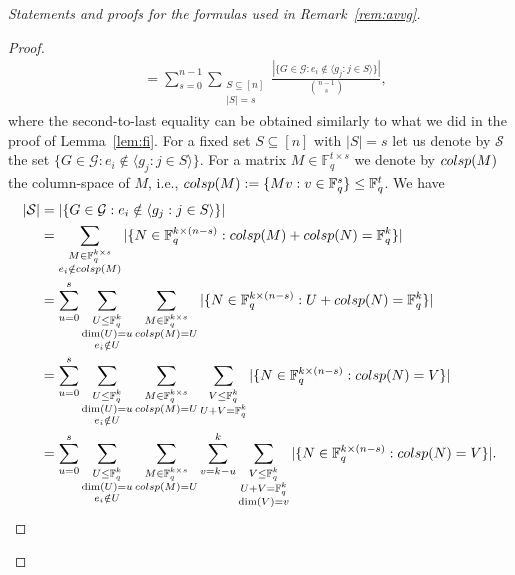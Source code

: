 \documentclass[11pt,a4paper,reqno,twoside]{amsart}
\theoremstyle{definition}
\newcommand{\F}{\mathbb{F}}
\newcommand{\E}{\mathbb{E}}
\newcommand{\mS}{\mathcal{S}}
\newcommand{\mG}{\mathcal{G}}
\begin{document}
\begin{appendix}
\begin{proof}[Statements and proofs for the formulas used in Remark~\ref{rem:avvg}]
\begin{proof}
\begin{align*}
    &= \sum_{s=0}^{n-1}\sum_{\substack{S \subseteq [n]\\ |S| = s}}\frac{|\{G \in \mG : e_i \notin \langle g_j :j \in S \rangle\}|}{\binom{n-1}{s}},
\end{align*}
where the second-to-last equality can be obtained similarly to what we did in the proof of Lemma~\ref{lem:fi}.
For a fixed set $S \subseteq [n]$ with $|S|=s$ let us denote by $\mS$ the set $\{G \in \mG : e_i \notin \langle g_j :j \in S \rangle\}$. For a matrix $M \in \F_q^{t \times s}$ we denote by $\textnormal{colsp}(M)$ the column-space of $M$, i.e., $\textnormal{colsp}(M):=\{Mv : v \in \F_q^s\} \le \F_q^t$. 
We have 
\begin{align*}
    |\mS| &= |\{G \in \mG : e_i \notin \langle g_j :j \in S \rangle\}| \\
    &=  \sum_{\substack{M \in \F_q^{k \times s} \\ e_i \notin \textnormal{colsp}(M)}}|\{N \in \F_q^{k \times (n-s)} : \textnormal{colsp}(M)+\textnormal{colsp}(N)=\F_q^k\}| \\
    &= \sum_{u=0}^s \sum_{\substack{U \le \F_q^k\\ \dim(U)=u \\ e_i \notin U}}\sum_{\substack{M \in \F_q^{k \times s} \\ \textnormal{colsp}(M)=U}}|\{N \in \F_q^{k \times (n-s)} : U+\textnormal{colsp}(N)=\F_q^k\}| \\
    &=\sum_{u=0}^s \sum_{\substack{U \le \F_q^k\\ \dim(U)=u \\ e_i \notin U}}\sum_{\substack{M \in \F_q^{k \times s} \\ \textnormal{colsp}(M)=U}}\sum_{\substack{V \le \F_q^k \\ U+V=\F_q^k}}|\{N \in \F_q^{k \times (n-s)} : \textnormal{colsp}(N)=V\}| \\
    &=\sum_{u=0}^s \sum_{\substack{U \le \F_q^k\\ \dim(U)=u \\ e_i \notin U}}\sum_{\substack{M \in \F_q^{k \times s} \\ \textnormal{colsp}(M)=U}}\sum_{v=k-u}^k\sum_{\substack{V \le \F_q^k \\ U+V=\F_q^k \\ \dim(V)=v}}|\{N \in \F_q^{k \times (n-s)} : \textnormal{colsp}(N)=V\}|.
\end{align*}

\end{proof}
\end{proof}
\end{appendix}
\end{document}
